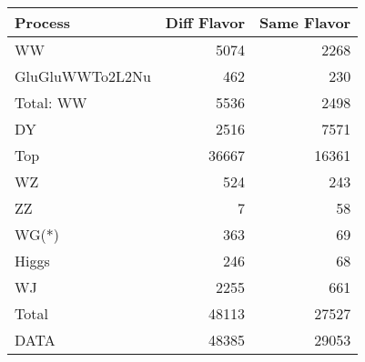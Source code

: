 \begin{table}[ht]
	\centering
\begin{tabular}{lrr}

         Process &  Diff Flavor &  Same Flavor \\
		\hline
              WW &         5074 &         2268 \\
 GluGluWWTo2L2Nu &          462 &          230 \\
\hline
       Total: WW &         5536 &         2498 \\
              DY &         2516 &         7571 \\
             Top &        36667 &        16361 \\
              WZ &          524 &          243 \\
              ZZ &            7 &           58 \\
           WG(*) &          363 &           69 \\
           Higgs &          246 &           68 \\
              WJ &         2255 &          661 \\
\hline
           Total &        48113 &        27527 \\
            DATA &        48385 &        29053 \\


\end{tabular}

\end{table}